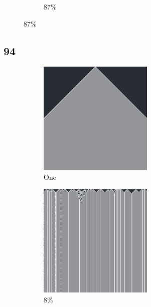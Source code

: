 \documentclass[12pt, fleqn]{report}                             %
\theoremstyle{break}                                            %
\begin{document}
\begin{figure}[ht!]
\begin{subfigure}[b]{0.4\linewidth}
          \caption{87\%}
        \end{subfigure}
      \end{figure}


      \clearpage
      \subsection{94}
      \begin{figure}[ht!]
        \centering
        \begin{subfigure}[b]{0.4\linewidth}
          \includegraphics[width=0.6\textwidth]{Images/94/a.png}
          \caption{One}
        \end{subfigure}
        \begin{subfigure}[b]{0.4\linewidth}
          \includegraphics[width=0.6\textwidth]{Images/94/b.png}
          \caption{8\%}
        \end{subfigure}
        \begin{subfigure}[b]{0.4\linewidth}

\end{subfigure}
\end{figure}
\end{document}
